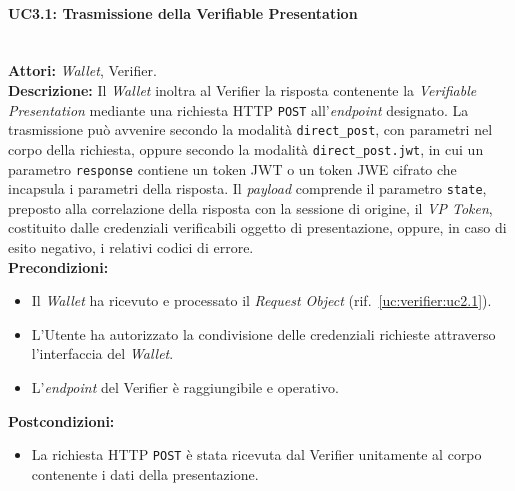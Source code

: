 \paragraph{\large\bfseries UC3.1: Trasmissione della Verifiable Presentation}
\label{uc:verifier:uc3.1}
\mbox{}\\
\noindent\textbf{Attori:} \textit{Wallet}, Verifier.
\\
\noindent\textbf{Descrizione:} Il \textit{Wallet} inoltra al Verifier la risposta contenente la \textit{Verifiable Presentation} mediante una richiesta HTTP \texttt{POST} all'\textit{endpoint} designato. La trasmissione può avvenire secondo la modalità \texttt{direct\_\allowbreak{}post}, con parametri nel corpo della richiesta, oppure secondo la modalità \texttt{direct\_\allowbreak{}post.jwt}, in cui un parametro \texttt{response} contiene un token JWT o un token JWE cifrato che incapsula i parametri della risposta. Il \textit{payload} comprende il parametro \texttt{state}, preposto alla correlazione della risposta con la sessione di origine, il \textit{VP Token}, costituito dalle credenziali verificabili oggetto di presentazione, oppure, in caso di esito negativo, i relativi codici di errore.
\\
\noindent\textbf{Precondizioni:}
\begin{itemize}
    \item Il \textit{Wallet} ha ricevuto e processato il \textit{Request Object} (rif.\ \ref{uc:verifier:uc2.1}).
    \item L'Utente ha autorizzato la condivisione delle credenziali richieste attraverso l'interfaccia del \textit{Wallet}.
    \item L'\textit{endpoint} del Verifier è raggiungibile e operativo.
\end{itemize}
\noindent\textbf{Postcondizioni:}
\begin{itemize}
    \item La richiesta HTTP \texttt{POST} è stata ricevuta dal Verifier unitamente al corpo contenente i dati della presentazione.
\end{itemize}

